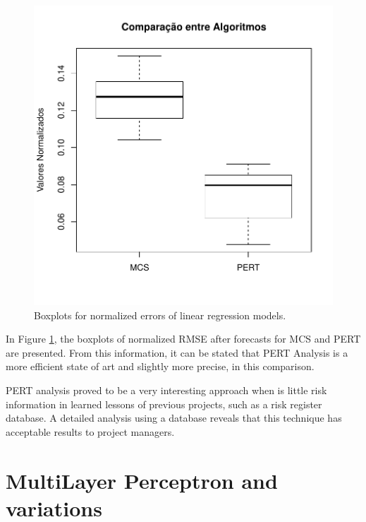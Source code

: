\begin{figure}[h]
  \vspace{-0.2cm}
  \centering
  \includegraphics[trim = 1mm 12mm 1mm 1mm,clip,width=0.7\columnwidth]{image/arte_ex2.pdf}
  \caption{Boxplots for normalized errors of linear regression models.}
  \label{fig:arte_result}
\end{figure}

In Figure \ref{fig:arte_result}, the boxplots of normalized RMSE after forecasts for MCS and PERT are presented. From this information, it can be stated that PERT Analysis is a more efficient state of art and slightly more precise, in this comparison.

PERT analysis proved to be a very interesting approach when is little risk information in learned lessons of previous projects, such as a risk register database. A detailed analysis using a database reveals that this technique has acceptable results to project managers.

\section{MultiLayer Perceptron and variations}

